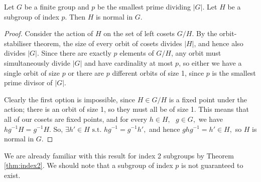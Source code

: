 \begin{theorem}
  Let $G$ be a finite group and $p$ be the smallest prime dividing $|G|$. Let $H$ be a
  subgroup of index $p$. Then $H$ is normal in $G$.
  \label{thm:cauchyGeneral}
\end{theorem}
\begin{proof}
    Consider the action of $H$ on the set of left cosets $G/H$. By the orbit-stabiliser theorem, the size of every orbit of cosets divides $|H|$, and hence also divides $|G|$. Since there are exactly $p$ elements of $G/H$, any orbit must simultaneously divide $|G|$ and have cardinality at most $p$, so either we have a single orbit of size $p$ or there are $p$ different orbits of size 1, since $p$ is the smallest prime divisor of $|G|$.
    
    
    
    
    Clearly the first option is impossible, since $H \in G/H$ is a fixed point under the action; 
    there is an orbit of size 1, so they must all be of size 1. This means that all of our cosets are fixed points, and for every $h \in H,\text{ } g \in G,$ we have $h g^{-1} H=g^{-1} H.$ So, $\exists h' \in H \text { s.t. } h g^{-1}=g^{-1} h',$ and hence $g h g^{-1}=h' \in H,$ so $H$ is normal in $G.$
\end{proof}
\begin{remark}
    We are already familiar with this result for index 2 subgroups by Theorem \ref{thm:index2}. We should 
    note that a subgroup of index $p$ is not guaranteed to exist.
\end{remark}

